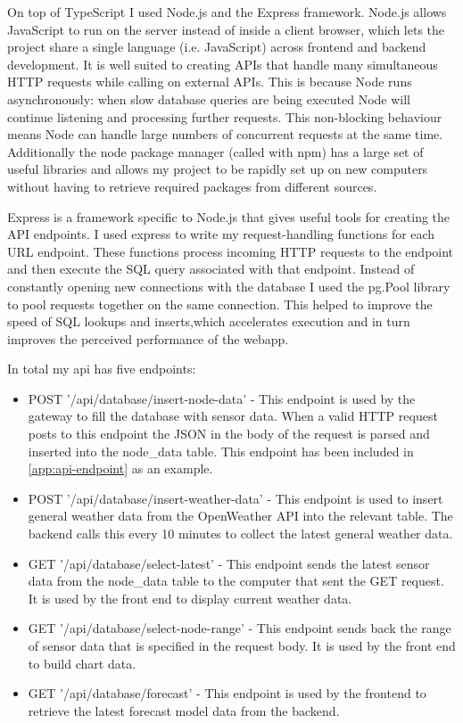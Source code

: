 On top of TypeScript I used Node.js and the Express framework. Node.js allows
JavaScript to run on the server instead of inside a client browser, which lets
the project share a single language (i.e. JavaScript) across frontend and
backend development. It is well suited to creating APIs that handle many
simultaneous HTTP requests while calling on external APIs. This is because Node
runs asynchronously: when slow database queries are being executed Node will
continue listening and processing further requests. This non-blocking behaviour
means Node can handle large numbers of concurrent requests at the same time.
Additionally the node package manager (called with npm) has a large set of
useful libraries and allows my project to be rapidly set up on new computers
without having to retrieve required packages from different sources.

Express is a framework specific to Node.js that gives useful tools for creating
the API endpoints. I used express to write my request-handling functions for
each URL endpoint. These functions process incoming HTTP requests to the
endpoint and then execute the SQL query associated with that endpoint. Instead
of constantly opening new connections with the database I used the pg.Pool
library to pool requests together on the same connection. This helped to improve
the speed of SQL lookups and inserts,which accelerates execution and in turn
improves the perceived performance of the webapp.

In total my api has five endpoints:

\begin{itemize}
    \item POST '/api/database/insert-node-data' - This endpoint is used by the
          gateway to fill the database with sensor data. When a valid HTTP request
          posts to this endpoint the JSON in the body of the request is parsed and
          inserted into the node\_data table. This endpoint has been included in
          \ref{app:api-endpoint} as an example.
    \item POST '/api/database/insert-weather-data' - This endpoint is used to
          insert general weather data from the OpenWeather API into the relevant
          table. The backend calls this every 10 minutes to collect the latest
          general weather data.
    \item GET '/api/database/select-latest' - This endpoint sends the latest
          sensor data from the node\_data table to the computer that sent the GET
          request. It is used by the front end to display current weather data.
    \item GET '/api/database/select-node-range' - This endpoint sends back the
          range of sensor data that is specified in the request body. It is used
          by the front end to build chart data.
    \item GET '/api/database/forecast' - This endpoint is used by the frontend to
          retrieve the latest forecast model data from the backend.
\end{itemize}

